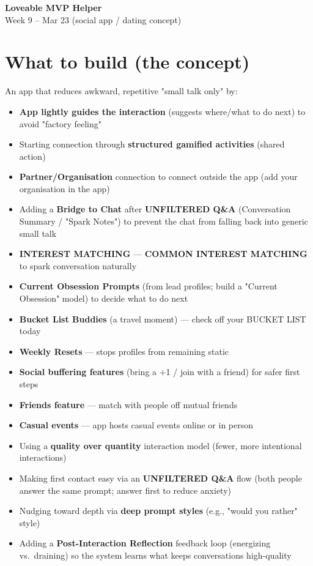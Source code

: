 \documentclass[10pt,a4paper]{article}
\begin{document}
\begin{center}
{\large\bfseries\color{eublue} Loveable MVP Helper}\\[0.2em]
\footnotesize Week 9 -- Mar 23 (social app / dating concept)
\end{center}\vspace{0.5em}

\section*{\color{eublue}What to build (the concept)}

An app that reduces awkward, repetitive "small talk only" by:
\begin{itemize}
\item \textbf{App lightly guides the interaction} (suggests where/what to do next) to avoid "factory feeling"
\item Starting connection through \textbf{structured gamified activities} (shared action)
\item \textbf{Partner/Organisation} connection to connect outside the app (add your organisation in the app)
\item Adding a \textbf{Bridge to Chat} after \textbf{UNFILTERED Q\&A} (Conversation Summary / "Spark Notes") to prevent the chat from falling back into generic small talk
\item \textbf{INTEREST MATCHING} --- \textbf{COMMON INTEREST MATCHING} to spark conversation naturally
\item \textbf{Current Obsession Prompts} (from lead profiles; build a "Current Obsession" model) to decide what to do next
\item \textbf{Bucket List Buddies} (a travel moment) --- check off your BUCKET LIST today
\item \textbf{Weekly Resets} --- stops profiles from remaining static
\item \textbf{Social buffering features} (bring a +1 / join with a friend) for safer first steps
\item \textbf{Friends feature} --- match with people off mutual friends
\item \textbf{Casual events} --- app hosts casual events online or in person
\item Using a \textbf{quality over quantity} interaction model (fewer, more intentional interactions)
\item Making first contact easy via an \textbf{UNFILTERED Q\&A} flow (both people answer the same prompt; answer first to reduce anxiety)
\item Nudging toward depth via \textbf{deep prompt styles} (e.g., "would you rather" style)
\item Adding a \textbf{Post-Interaction Reflection} feedback loop (energizing vs.\ draining) so the system learns what keeps conversations high-quality
\end{itemize}
\end{document}
